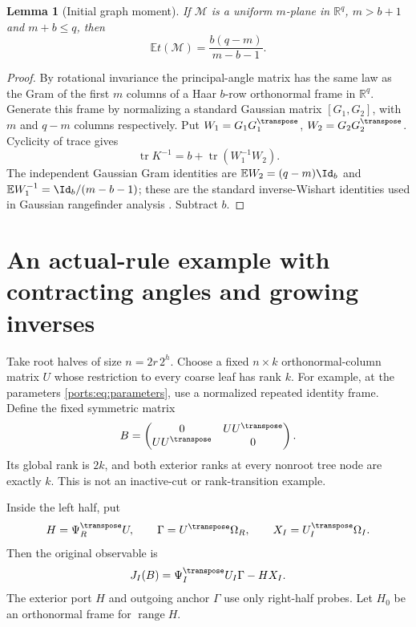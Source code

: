 \documentclass[11pt,oneside,openany,a4paper]{book}
\numberwithin{equation}{chapter}
\newtheorem{lemma}[theorem]{Lemma}
\theoremstyle{definition}
\theoremstyle{remark}
\newcommand{\R}{\mathbb R}\newcommand{\E}{\mathbb E}\newcommand{\Prb}{\mathbb P}\newcommand{\PP}{\mathbb P}
\DeclareMathOperator{\tr}{tr}\DeclareMathOperator{\rank}{rank}
\DeclareMathOperator{\ran}{range}\DeclareMathOperator{\OPT}{OPT}
\begin{document}
\begin{lemma}[Initial graph moment]\label{ports:lem:initial}
If $\mathscr M$ is a uniform $m$-plane in $\R^q$, $m>b+1$ and $m+b\le q$, then
\begin{equation}\label{ports:eq:t0}
 \E t(\mathscr M)=\frac{b(q-m)}{m-b-1}.
\end{equation}
\end{lemma}
\begin{proof}
By rotational invariance the principal-angle matrix has the same law as the Gram of the first $m$ columns of a Haar $b$-row orthonormal frame in $\R^q$. Generate this frame by normalizing a standard Gaussian matrix $[G_1,G_2]$, with $m$ and $q-m$ columns respectively. Put $W_1=G_1G_1^\transpose$, $W_2=G_2G_2^\transpose$. Cyclicity of trace gives
\[
 \tr K^{-1}=b+\tr(W_1^{-1}W_2).
\]
The independent Gaussian Gram identities are $\E W_2=(q-m)\Id_b$ and $\E W_1^{-1}=\Id_b/(m-b-1)$; these are the standard inverse-Wishart identities used in Gaussian rangefinder analysis \cite{HMT}. Subtract $b$.
\end{proof}

\section{An actual-rule example with contracting angles and growing inverses}
Take root halves of size $n=2r\,2^h$. Choose a fixed $n\times k$ orthonormal-column matrix $U$ whose restriction to every coarse leaf has rank $k$. For example, at the parameters \eqref{ports:eq:parameters}, use a normalized repeated identity frame. Define the fixed symmetric matrix
\begin{equation}\label{ports:eq:B}
 B=\begin{pmatrix}0&UU^\transpose\\UU^\transpose&0\end{pmatrix}.
\end{equation}
Its global rank is $2k$, and both exterior ranks at every nonroot tree node are exactly $k$. This is not an inactive-cut or rank-transition example.

Inside the left half, put
\[
 H=\Psi_R^\transpose U,\qquad \Gamma=U^\transpose\Omega_R,
 \qquad X_I=U_I^\transpose\Omega_I.
\]
Then the original observable is
\begin{equation}\label{ports:eq:familyJ}
 J_I(B)=\Psi_I^\transpose U_I\Gamma-HX_I.
\end{equation}
The exterior port $H$ and outgoing anchor $\Gamma$ use only right-half probes. Let $H_0$ be an orthonormal frame for $\ran H$.
\end{document}
